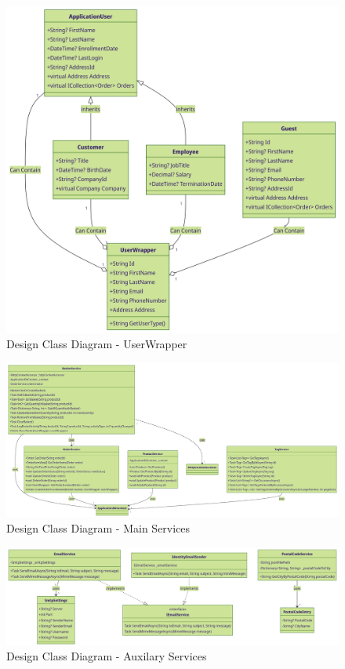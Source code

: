 \begin{figure}
    \centering
    \includegraphics[width=1\textwidth]{figures/diagrams/dcd-user-userwrapper.png}
    \caption{Design Class Diagram - UserWrapper}
    \label{fig:class-diagram-userwrapper}
\end{figure}

\begin{figure}
    \centering
    \includegraphics[width=1\textwidth]{figures/diagrams/dcd-main-services.png}
    \caption{Design Class Diagram - Main Services}
    \label{fig:class-diagram-main-services}
\end{figure}

\begin{figure}
    \centering
    \includegraphics[width=1\textwidth]{figures/diagrams/dcd-aux-services.png}
    \caption{Design Class Diagram - Auxilary Services}
    \label{fig:class-diagram-aux-services}
\end{figure}

